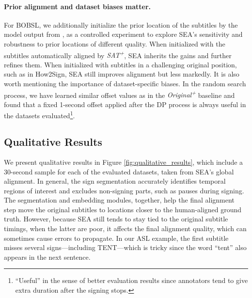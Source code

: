 \documentclass[11pt]{article}
\newcommand{\lili}[1]{{\color{green}[lili: #1]}} %
\begin{document}
\paragraph{Prior alignment and dataset biases matter.} 
For BOBSL, we additionally initialize the prior location of the subtitles by the model output from \citet{jang2025deep}, as a controlled experiment to explore SEA’s sensitivity and robustness to prior locations of different quality.
When initialized with the subtitles automatically aligned by \textit{SAT\textsuperscript{+}}, SEA inherits the gains and further refines them.
When initialized with subtitles in a challenging original position, such as in How2Sign, SEA still improves alignment but less markedly.
It is also worth mentioning the importance of dataset-specific biases. In the random search process, we have learned similar offset values as in the \textit{Original\textsuperscript{+}} baseline and found that a fixed 1-second offset applied after the DP process is always useful in the datasets evaluated\footnote{``Useful'' in the sense of better evaluation results since annotators tend to give extra duration after the signing stops.}.



\subsection{Qualitative Results}
\label{sec:qualitative}


We present qualitative results in Figure \ref{fig:qualitative_results}, which include a 30-second sample for each of the evaluated datasets, taken from SEA's global alignment.
In general, the sign segmentation accurately identifies temporal regions of interest and excludes non-signing parts, such as pauses during signing. 
The segmentation and embedding modules, together, help the final alignment step move the original subtitles to locations closer to the human-aligned ground truth. 
However, because SEA still tends to stay tied to the original subtitle timings, when the latter are poor, it affects the final alignment quality, which can sometimes cause errors to propagate. 
In our ASL example, the first subtitle misses several signs—including TENT—which is tricky since the word ``tent'' also appears in the next sentence.
\end{document}
